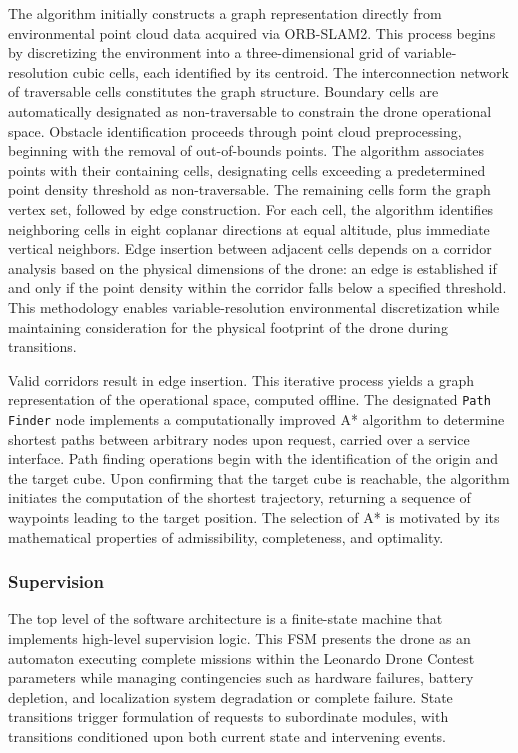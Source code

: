 The algorithm initially constructs a graph representation directly from environmental point cloud data acquired via ORB-SLAM2. This process begins by discretizing the environment into a three-dimensional grid of variable-resolution cubic cells, each identified by its centroid. The interconnection network of traversable cells constitutes the graph structure. Boundary cells are automatically designated as non-traversable to constrain the drone operational space. Obstacle identification proceeds through point cloud preprocessing, beginning with the removal of out-of-bounds points. The algorithm associates points with their containing cells, designating cells exceeding a predetermined point density threshold as non-traversable. The remaining cells form the graph vertex set, followed by edge construction. For each cell, the algorithm identifies neighboring cells in eight coplanar directions at equal altitude, plus immediate vertical neighbors. Edge insertion between adjacent cells depends on a corridor analysis based on the physical dimensions of the drone: an edge is established if and only if the point density within the corridor falls below a specified threshold. This methodology enables variable-resolution environmental discretization while maintaining consideration for the physical footprint of the drone during transitions.

Valid corridors result in edge insertion. This iterative process yields a graph representation of the operational space, computed offline. The designated \texttt{Path Finder} \ROS node implements a computationally improved A* algorithm to determine shortest paths between arbitrary nodes upon request, carried over a service interface. Path finding operations begin with the identification of the origin and the target cube. Upon confirming that the target cube is reachable, the algorithm initiates the computation of the shortest trajectory, returning a sequence of waypoints leading to the target position. The selection of A* is motivated by its mathematical properties of admissibility, completeness, and optimality.

\subsubsection{Supervision}
\label{sec:robots_results_paperdrone2021_supervision}
The top level of the software architecture is a finite-state machine that implements high-level supervision logic. This FSM presents the drone as an automaton executing complete missions within the Leonardo Drone Contest parameters while managing contingencies such as hardware failures, battery depletion, and localization system degradation or complete failure. State transitions trigger formulation of requests to subordinate modules, with transitions conditioned upon both current state and intervening events.

